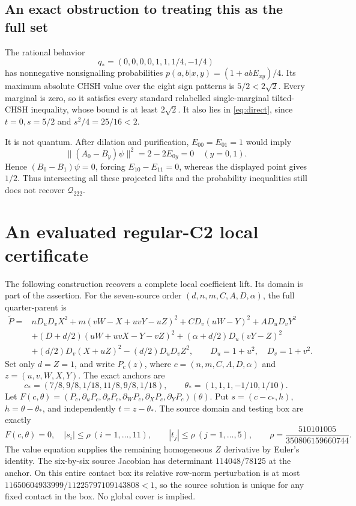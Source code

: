 \documentclass[11pt]{article}
\newcommand{\Q}{\mathcal Q_{222}}
\begin{document}
\subsection{An exact obstruction to treating this as the full set}

The rational behavior
\[
 q_*=(0,0,0,0,1,1,1/4,-1/4)
\]
has nonnegative nonsignalling probabilities
$p(a,b|x,y)=(1+abE_{xy})/4$. Its maximum absolute CHSH value over
the eight sign patterns is $5/2<2\sqrt2$. Every marginal is zero,
so it satisfies every standard relabelled single-marginal tilted-CHSH
inequality, whose bound is at least $2\sqrt2$. It also lies in
\eqref{eq:direct}, since $t=0,s=5/2$ and $s^2/4=25/16<2$.

It is not quantum. After dilation and purification, $E_{00}=E_{01}=1$
would imply
\[
 \|(A_0-B_y)\psi\|^2=2-2E_{0y}=0\quad(y=0,1).
\]
Hence $(B_0-B_1)\psi=0$, forcing $E_{10}-E_{11}=0$, whereas the
displayed point gives $1/2$. Thus intersecting all these projected
lifts and the probability inequalities still does not recover $\Q$.

\section{An evaluated regular-C2 local certificate}

The following construction recovers a complete local coefficient lift.
Its domain is part of the assertion. For the seven-source order
$(d,n,m,C,A,D,\alpha)$, the full quarter-parent is
\begin{align*}
 \widetilde P={}&nD_uD_vX^2+m(vW-X+uvY-uZ)^2+CD_v(uW-Y)^2+AD_uD_vY^2\\
 &+(D+d/2)(uW+uvX-Y-vZ)^2+(\alpha+d/2)D_u(vY-Z)^2\\
 &+(d/2)D_v(X+uZ)^2-(d/2)D_uD_vZ^2,
 \qquad D_u=1+u^2,\quad D_v=1+v^2.
\end{align*}
Set only $d=Z=1$, and write $P_c(z)$, where
$c=(n,m,C,A,D,\alpha)$ and $z=(u,v,W,X,Y)$. The exact anchors are
\[
 c_*=(7/8,9/8,1/18,11/8,9/8,1/18),\qquad
 \theta_*=(1,1,1,-1/10,1/10).
\]
Let $F(c,\theta)=(P_c,\partial_uP_c,\partial_vP_c,
\partial_WP_c,\partial_XP_c,\partial_YP_c)(\theta)$.
Put $s=(c-c_*,h)$, $h=\theta-\theta_*$, and independently
$t=z-\theta_*$. The source domain and testing box are exactly
\[
 F(c,\theta)=0,\quad |s_i|\leq\rho\ (i=1,\ldots,11),\qquad
 |t_j|\leq\rho\ (j=1,\ldots,5),\qquad
 \rho=\frac{510101005}{350806159660744}.
\]
The value equation supplies the remaining homogeneous $Z$ derivative
by Euler's identity. The six-by-six source Jacobian has determinant
$114048/78125$ at the anchor. On this entire contact box its relative
row-norm perturbation is at most
$11650604933999/11225797109143808<1$, so the source solution is unique
for any fixed contact in the box. No global cover is implied.
\end{document}
